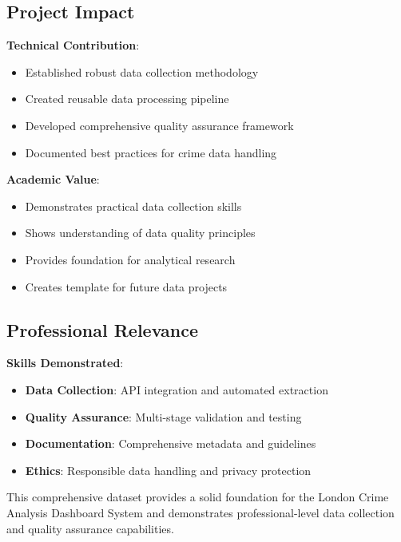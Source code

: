 \documentclass[12pt,a4paper]{article}
\begin{document}
\subsection{Project Impact}

\textbf{Technical Contribution}:
\begin{itemize}
    \item Established robust data collection methodology
    \item Created reusable data processing pipeline
    \item Developed comprehensive quality assurance framework
    \item Documented best practices for crime data handling
\end{itemize}

\textbf{Academic Value}:
\begin{itemize}
    \item Demonstrates practical data collection skills
    \item Shows understanding of data quality principles
    \item Provides foundation for analytical research
    \item Creates template for future data projects
\end{itemize}

\subsection{Professional Relevance}

\textbf{Skills Demonstrated}:
\begin{itemize}
    \item \textbf{Data Collection}: API integration and automated extraction
    \item \textbf{Quality Assurance}: Multi-stage validation and testing
    \item \textbf{Documentation}: Comprehensive metadata and guidelines
    \item \textbf{Ethics}: Responsible data handling and privacy protection
\end{itemize}

This comprehensive dataset provides a solid foundation for the London Crime Analysis Dashboard System and demonstrates professional-level data collection and quality assurance capabilities.
\end{document}
